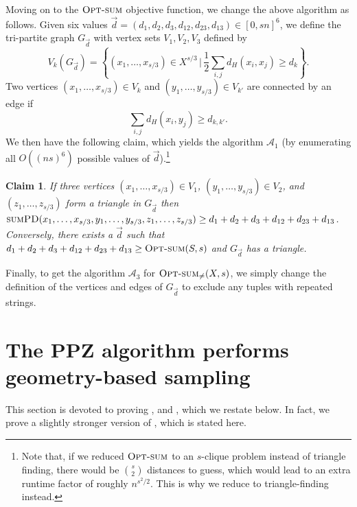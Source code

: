 \documentclass[11pt, letterpaper]{article}
\newtheorem{claim}[theorem]{Claim}
\theoremstyle{definition}
\newcommand{\SPD}{\textsc{sumPD}}
\newcommand{\opts}{\textsc{Opt-sum}}
\begin{document}
Moving on to the $\opts$ objective function, we change the above algorithm as follows.  Given six values $\vec{d} = (d_1, d_2, d_3, d_{12}, d_{23}, d_{13}) \in [0, sn]^6$, we define the tri-partite graph $G_{\vec{d}}$ with vertex sets $V_1, V_2, V_3$ defined by
\[
V_k(G_{\vec d}) = \left\{ (x_1, \ldots, x_{s/3}) \in X^{s/3} \,|\, \frac{1}{2} \sum_{i,j} d_H(x_i, x_j) \ge d_k \right\}.
\]
Two vertices $(x_1, \ldots, x_{s/3}) \in V_{k}$ and $(y_1, \ldots, y_{s/3}) \in V_{k'}$ are connected by an edge if 
\[
\sum_{i,j} d_H(x_i, y_j) \ge d_{k,k'}.
\]
We then have the following claim, which yields the algorithm $\mathcal{A}_1$ (by enumerating all $O((ns)^6)$ possible values of $\vec{d}$).\footnote{Note that, if we reduced $\opts$ to an $s$-clique problem instead of triangle finding, there would be ${s \choose 2}$ distances to guess, which would lead to an extra runtime factor of roughly $n^{s^2/2}$.  This is why we reduce to triangle-finding instead.}
\begin{claim}
    If three vertices $(x_1, \ldots, x_{s/3}) \in V_1$, $(y_1, \ldots, y_{s/3}) \in V_2$, and $(z_1, \ldots, z_{s/3})$ form a triangle in $G_{\vec{d}}$ then $\SPD(x_1, \ldots, x_{s/3}, y_1, \ldots, y_{s/3}, z_1, \ldots, z_{s/3}) \ge d_1 + d_2 + d_3 + d_{12} + d_{23} + d_{13}$.
    Conversely, there exists a $\vec{d}$ such that $d_1 + d_2 + d_3 + d_{12} + d_{23} + d_{13} \ge \opts(S, s)$ and $G_{\vec{d}}$ has a triangle.
\end{claim}

Finally, to get the algorithm $\mathcal{A}_3$ for $\opts_{\neq}(X, s)$, we simply change the definition of the vertices and edges of $G_{\vec{d}}$ to exclude any tuples with repeated strings.
  \section{The PPZ algorithm performs geometry-based sampling}\label{sec:PPZ}
This section is devoted to proving ,  and , which we restate below. In fact, we prove a slightly stronger version of , which is stated here.

\ppzdiam*
\end{document}
